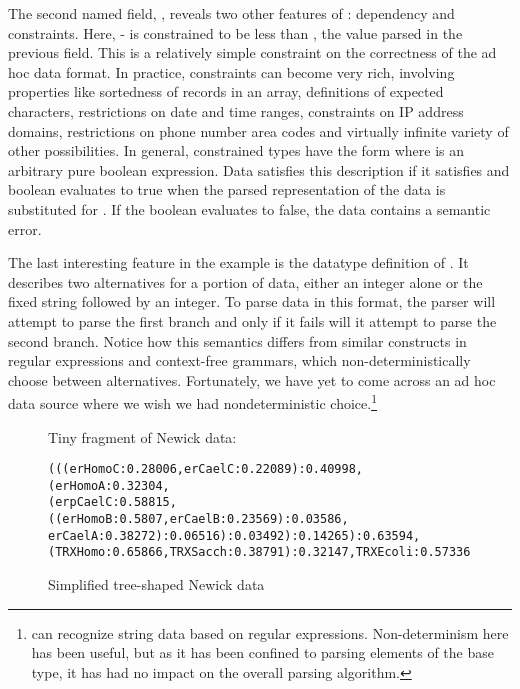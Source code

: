 The second named field, , reveals two other
features of \padsml: dependency and constraints.  Here,
- is constrained to be less than ,
the value parsed in the previous field.  This is a relatively simple
constraint on the correctness of the ad hoc data format.  In practice,
constraints can become very rich, involving properties like
sortedness of records in an array, definitions of expected characters,
restrictions on date and time ranges, constraints on IP address
domains, restrictions on phone number area codes and virtually
infinite variety of other possibilities. In general, constrained
types have the form \cd{[x:T | e]} where  is an arbitrary pure
boolean expression.  Data satisfies this description if it
satisfies  and boolean  evaluates to true when the parsed
representation of the data is substituted for .  If the boolean
evaluates to false, the data contains a semantic error.

The last interesting feature in the \dibbler{} example is the datatype
definition of .  It describes two alternatives for a
portion of data, either an integer alone or the fixed string
 followed by an integer.  To parse data in this format,
the parser will attempt to parse the first branch and only if it fails
will it attempt to parse the second branch.  Notice how this semantics
differs from similar constructs in regular expressions and
context-free grammars, which non-deterministically choose between
alternatives.  Fortunately, we have yet to come across an ad hoc data
source where we wish we had nondeterministic choice.\footnote{\padsml{}
  can recognize string data based on regular expressions.
  Non-determinism here has been useful, but as it has been confined to
  parsing elements of the  base type, it has had no impact
  on the overall parsing algorithm.}

\begin{figure}

Tiny fragment of Newick data:

{\scriptsize
\begin{verbatim}
(((erHomoC:0.28006,erCaelC:0.22089):0.40998,(erHomoA:0.32304,
(erpCaelC:0.58815,((erHomoB:0.5807,erCaelB:0.23569):0.03586,
erCaelA:0.38272):0.06516):0.03492):0.14265):0.63594,
(TRXHomo:0.65866,TRXSacch:0.38791):0.32147,TRXEcoli:0.57336)
\end{verbatim}
}
  \caption{Simplified tree-shaped Newick data}
  \label{fig:newick}
\end{figure}

